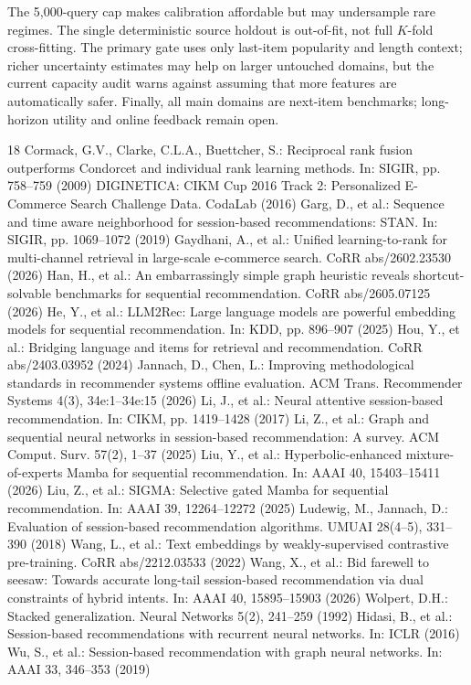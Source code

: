 \documentclass[runningheads]{llncs}
\begin{document}
The 5,000-query cap makes calibration affordable but may undersample rare
regimes. The single deterministic source holdout is out-of-fit, not full
$K$-fold cross-fitting. The primary gate uses only last-item popularity and
length context; richer uncertainty estimates may help on larger untouched
domains, but the current capacity audit warns against assuming that more
features are automatically safer. Finally, all main domains are
next-item benchmarks; long-horizon utility and online feedback remain open.

\enlargethispage{4\baselineskip}
\begin{thebibliography}{18}
\setlength{\itemsep}{-1pt}
 Cormack, G.V., Clarke, C.L.A., Buettcher, S.:
Reciprocal rank fusion outperforms Condorcet and individual rank learning
methods. In: SIGIR, pp. 758--759 (2009)
 DIGINETICA: CIKM Cup 2016 Track 2: Personalized
E-Commerce Search Challenge Data. CodaLab (2016)
 Garg, D., et al.: Sequence and time aware neighborhood
for session-based recommendations: STAN. In: SIGIR, pp. 1069--1072 (2019)
 Gaydhani, A., et al.: Unified learning-to-rank
for multi-channel retrieval in large-scale e-commerce search. CoRR
abs/2602.23530 (2026)
 Han, H., et al.: An embarrassingly simple graph
heuristic reveals shortcut-solvable benchmarks for sequential recommendation.
CoRR abs/2605.07125 (2026)
 He, Y., et al.: LLM2Rec: Large language models are
powerful embedding models for sequential recommendation. In: KDD,
pp. 896--907 (2025)
 Hou, Y., et al.: Bridging language and items
for retrieval and recommendation. CoRR abs/2403.03952 (2024)
 Jannach, D., Chen, L.: Improving methodological
standards in recommender systems offline evaluation. ACM Trans. Recommender
Systems 4(3), 34e:1--34e:15 (2026)
 Li, J., et al.: Neural attentive session-based
recommendation. In: CIKM, pp. 1419--1428 (2017)
 Li, Z., et al.: Graph and sequential neural networks in
session-based recommendation: A survey. ACM Comput. Surv. 57(2), 1--37 (2025)
 Liu, Y., et al.: Hyperbolic-enhanced mixture-of-experts
Mamba for sequential recommendation. In: AAAI 40, 15403--15411 (2026)
 Liu, Z., et al.: SIGMA: Selective gated Mamba for
sequential recommendation. In: AAAI 39, 12264--12272 (2025)
 Ludewig, M., Jannach, D.: Evaluation of
session-based recommendation algorithms. UMUAI 28(4--5), 331--390 (2018)
 Wang, L., et al.: Text embeddings by weakly-supervised
contrastive pre-training. CoRR abs/2212.03533 (2022)
 Wang, X., et al.: Bid farewell to seesaw: Towards
accurate long-tail session-based recommendation via dual constraints of
hybrid intents. In: AAAI 40, 15895--15903 (2026)
 Wolpert, D.H.: Stacked generalization. Neural
Networks 5(2), 241--259 (1992)
 Hidasi, B., et al.: Session-based recommendations
with recurrent neural networks. In: ICLR (2016)
 Wu, S., et al.: Session-based recommendation with graph
neural networks. In: AAAI 33, 346--353 (2019)
\end{thebibliography}
\end{document}
